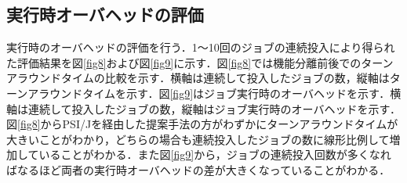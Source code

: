 \subsection{実行時オーバヘッドの評価}
実行時のオーバヘッドの評価を行う．1～10回のジョブの連続投入により得られた評価結果を図\ref{fig8}および図\ref{fig9}に示す．図\ref{fig8}では機能分離前後でのターンアラウンドタイムの比較を示す．横軸は連続して投入したジョブの数，縦軸はターンアラウンドタイムを示す．図\ref{fig9}はジョブ実行時のオーバヘッドを示す．横軸は連続して投入したジョブの数，縦軸はジョブ実行時のオーバヘッドを示す．図\ref{fig8}からPSI/Jを経由した提案手法の方がわずかにターンアラウンドタイムが大きいことがわかり，どちらの場合も連続投入したジョブの数に線形比例して増加していることがわかる．また図\ref{fig9}から，ジョブの連続投入回数が多くなればなるほど両者の実行時オーバヘッドの差が大きくなっていることがわかる．\par


